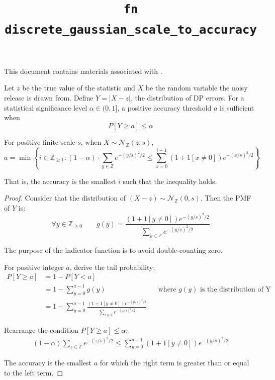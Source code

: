 \documentclass{article}
\title{\texttt{fn discrete\_gaussian\_scale\_to\_accuracy}}
\author{\MichaelShoemateAuthor}
\begin{document}
\maketitle
\contrib

This document contains materials associated with .

\begin{definition}
    Let $z$ be the true value of the statistic and $X$ be the random variable the noisy release is drawn from.
    Define $Y = |X - z|$, the distribution of DP errors.
    For a statistical significance level $\alpha\in(0,1]$, a positive accuracy threshold $a$ is sufficient when
    \begin{equation}
        P[Y \ge a]\leq\alpha
    \end{equation}
\end{definition}

\begin{theorem}
    For positive finite scale $s$, when $X \sim \mathcal{N}_\mathbb{Z}(z, s)$,
    \begin{equation}
        a = \min\left\{i\in\mathbb{Z}_{\ge 1}:(1 - \alpha) \cdot \sum_{y\in \mathbb{Z}} e^{-(y/s)^2/2}
        \le \sum_{x=0}^{i - 1} (1 + 1[x \ne 0]) e^{-(x/s)^2/2} \right\}
    \end{equation}

    That is, the accuracy is the smallest $i$ such that the inequality holds.
\end{theorem}

\begin{proof}

Consider that the distribution of $(X - z) \sim \mathcal{N}_\mathbb{Z}(0, s)$.
Then the PMF of $Y$ is:
\begin{equation}
    \forall y \in \mathbb{Z}_{\ge 0} \qquad g(y) = \frac{(1 + 1[y \ne 0]) e^{-(y/s)^2/2}}{\sum_{y \in \mathbb{Z}} e^{-(y/s)^2/2} }
\end{equation}

The purpose of the indicator function is to avoid double-counting zero.

For positive integer $a$, derive the tail probability:
\begin{align*}
    P[Y \ge a] &= 1 - P[Y < a] \\
    &= 1 - \sum_{y=0}^{a - 1} g(y) && \text{where $g(y)$ is the distribution of Y} \\
    &= 1 - \sum_{y=0}^{a - 1} \frac{(1 + 1[y \ne 0]) e^{-(y/s)^2/2}}{\sum_{z \in \mathbb{Z}} e^{-(z/s)^2/2} }
\end{align*}

Rearrange the condition $P[Y\ge a]\le\alpha$:
\begin{align*}
    (1 - \alpha) \sum_{z \in \mathbb{Z}} e^{-(z/s)^2/2} \le \sum_{y=0}^{a - 1} (1 + 1[y \ne 0]) e^{-(y/s)^2/2}
\end{align*}

The accuracy is the smallest $a$ for which the right term is greater than or equal to the left term.
\end{proof}
\end{document}
